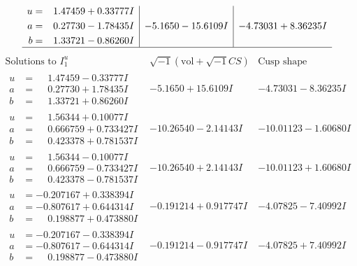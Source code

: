 \documentclass[1p]{elsarticle_modified}
\theoremstyle{definition}
\newcommand{\I}{\sqrt{-1}}
\begin{document}
$$\begin{array}{c|c|c}
\begin{aligned}
u &= \phantom{-}1.47459 + 0.33777 I \\
a &= \phantom{-}0.27730 - 1.78435 I \\
b &= \phantom{-}1.33721 - 0.86260 I\end{aligned}
 & -5.1650 - 15.6109 I & -4.73031 + 8.36235 I\\
 \hline 
 \end{array}$$\newpage$$\begin{array}{c|c|c}  
\text{Solutions to }I^u_{1}& \I (\text{vol} + \sqrt{-1}CS) & \text{Cusp shape}\\
 \hline 
\begin{aligned}
u &= \phantom{-}1.47459 - 0.33777 I \\
a &= \phantom{-}0.27730 + 1.78435 I \\
b &= \phantom{-}1.33721 + 0.86260 I\end{aligned}
 & -5.1650 + 15.6109 I & -4.73031 - 8.36235 I \\ \hline\begin{aligned}
u &= \phantom{-}1.56344 + 0.10077 I \\
a &= \phantom{-}0.666759 + 0.733427 I \\
b &= \phantom{-}0.423378 + 0.781537 I\end{aligned}
 & -10.26540 - 2.14143 I & -10.01123 - 1.60680 I \\ \hline\begin{aligned}
u &= \phantom{-}1.56344 - 0.10077 I \\
a &= \phantom{-}0.666759 - 0.733427 I \\
b &= \phantom{-}0.423378 - 0.781537 I\end{aligned}
 & -10.26540 + 2.14143 I & -10.01123 + 1.60680 I \\ \hline\begin{aligned}
u &= -0.207167 + 0.338394 I \\
a &= -0.807617 + 0.644314 I \\
b &= \phantom{-}0.198877 + 0.473880 I\end{aligned}
 & -0.191214 + 0.917747 I & -4.07825 - 7.40992 I \\ \hline\begin{aligned}
u &= -0.207167 - 0.338394 I \\
a &= -0.807617 - 0.644314 I \\
b &= \phantom{-}0.198877 - 0.473880 I\end{aligned}
 & -0.191214 - 0.917747 I & -4.07825 + 7.40992 I \\ \hline\begin{aligned}

\end{aligned}
\end{array}$$
\end{document}
